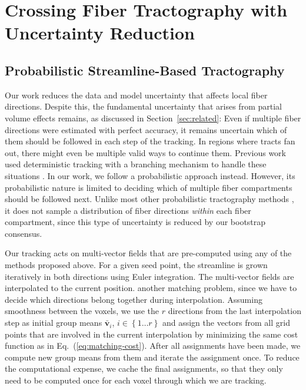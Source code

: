 \section{Crossing Fiber Tractography with Uncertainty Reduction}
\label{sec:tracking}
\subsection{Probabilistic Streamline-Based Tractography}

Our work reduces the data and model uncertainty that affects local fiber directions. Despite this, the fundamental uncertainty that arises from partial volume effects remains, as discussed in Section~\ref{sec:related}: Even if multiple fiber directions were estimated with perfect accuracy, it remains  uncertain which of them should be followed in each step of the tracking. In regions where tracts fan out, there might even be multiple valid ways to continue them. Previous work used deterministic tracking with a branching mechanism to handle these situations \cite{Ankele:CARS2017}. In our work, we follow a probabilistic approach instead. However, its probabilistic nature is limited to deciding which of multiple fiber compartments should be followed next. Unlike most other probabilistic tractography methods \cite{BEHRENS2007144,Jones:2008}, it does not sample a distribution of fiber directions \emph{within} each fiber compartment, since this type of uncertainty is reduced by our bootstrap consensus.

Our tracking acts on multi-vector fields that are pre-computed using any of the methods proposed above. For a given seed point, the streamline is grown iteratively in both directions using Euler
integration. The multi-vector fields are interpolated to the current position.  another matching problem, since we have to decide which
directions belong together during interpolation. Assuming
smoothness between the voxels, we use the $r$ directions from the last
interpolation step as initial group means $\bar{\mathbf{v}}_i$, $i \in \left\{ 1\dots r 
\right\}$ and assign the vectors from all grid points that are involved in the current interpolation by minimizing the same cost function as in Eq.~(\ref{eq:matching-cost}).  After all assignments have been made, we compute new group means from them and iterate the assignment once. To reduce the computational expense, we cache the final assignments, so that they only need to be computed once for each voxel through which we are tracking.

